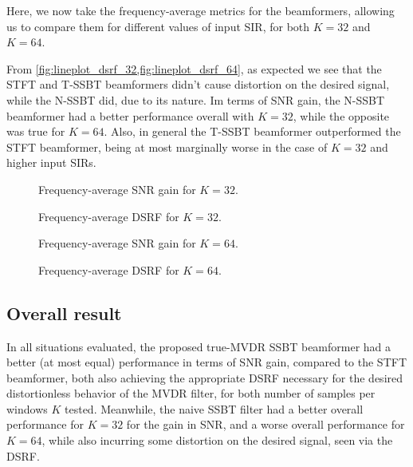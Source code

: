 Here, we now take the frequency-average metrics for the beamformers, allowing us to compare them for different values of input SIR, for both $K = 32$ and $K = 64$.

From \cref{fig:lineplot_dsrf_32,fig:lineplot_dsrf_64}, as expected we see that the STFT and T-SSBT beamformers didn't cause distortion on the desired signal, while the N-SSBT did, due to its nature. Im terms of SNR gain, the N-SSBT beamformer had a better performance overall with $K = 32$, while the opposite was true for $K = 64$. Also, in general the T-SSBT beamformer outperformed the STFT beamformer, being at most marginally worse in the case of $K = 32$ and higher input SIRs.
\begin{figure}[H]
	\centering
	
	\caption{Frequency-average SNR gain for $K = 32$.}
	\label{fig:lineplot_gain_32}
\end{figure}
\begin{figure}[H]
	\centering
	
	\caption{Frequency-average DSRF for $K = 32$.}
	\label{fig:lineplot_dsrf_32}
\end{figure}

\begin{figure}[H]
	\centering
	
	\caption{Frequency-average SNR gain for $K = 64$.}
	\label{fig:lineplot_gain_64}
\end{figure}
\begin{figure}[H]
	\centering
	
	\caption{Frequency-average DSRF for $K = 64$.}
	\label{fig:lineplot_dsrf_64}
\end{figure}

\subsection{Overall result}

In all situations evaluated, the proposed true-MVDR SSBT beamformer had a better (at most equal) performance in terms of SNR gain, compared to the STFT beamformer, both also achieving the appropriate DSRF necessary for the desired distortionless behavior of the MVDR filter, for both number of samples per windows $K$ tested. Meanwhile, the naive SSBT filter had a better overall performance for $K = 32$ for the gain in SNR, and a worse overall performance for $K = 64$, while also incurring some distortion on the desired signal, seen via the DSRF.
